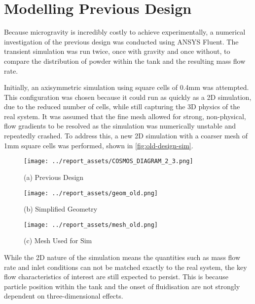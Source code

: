 \section{Modelling Previous Design}\label{sec:old-design-method}
Because microgravity is incredibly costly to achieve experimentally, a numerical investigation of the previous design was conducted using ANSYS Fluent. The transient simulation was run twice, once with gravity and once without, to compare the distribution of powder within the tank and the resulting mass flow rate. 

Initially, an axisymmetric simulation using square cells of 0.4mm was attempted. This configuration was chosen because it could run as quickly as a 2D simulation, due to the reduced number of cells, while still capturing the 3D physics of the real system. It was assumed that the fine mesh allowed for strong, non-physical, flow gradients to be resolved as the simulation was numerically unstable and repeatedly crashed. To address this, a new 2D simulation with a coarser mesh of 1mm square cells was performed, shown in \autoref{fig:old-design-sim}.
\begin{figure}[htbp]
    \centering

    \begin{minipage}{0.25\textwidth}
        \centering
        \texttt{[image: ../report\_assets/COSMOS\_DIAGRAM\_2\_3.png]}
        \caption*{(a) Previous Design}
    \end{minipage}
    \hfill
    \begin{minipage}{0.25\textwidth}
        \centering
        \texttt{[image: ../report\_assets/geom\_old.png]}
        \caption*{(b) Simplified Geometry}\label{fig:idkyet9}
    \end{minipage}
    \hfill
    \begin{minipage}{0.25\textwidth}
        \centering
        \texttt{[image: ../report\_assets/mesh\_old.png]}
        \caption*{(c) Mesh Used for Sim}\label{fig:idkyet10}
    \end{minipage}
    
\end{figure}\label{fig:old-design-sim}
While the 2D nature of the simulation means the quantities such as mass flow rate and inlet conditions can not be matched exactly to the real system, the key flow characteristics of interest are still expected to persist. This is because particle position within the tank and the onset of fluidisation are not strongly dependent on three-dimensional effects.

